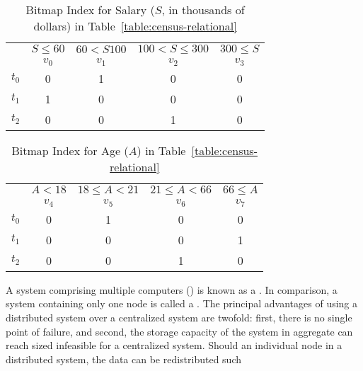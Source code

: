 \begin{table}[H]
    \centering
    \caption{Bitmap Index for Salary (\(S\), in thousands of dollars) in Table~\ref{table:census-relational}}
    \label{table:census-salary}
    \begin{tabular}{@{}r||c|c|c|c@{}}
        \toprule
                & \(S \leq 60\) & \(60 < S 100\) & \(100 < S \leq 300\) & \(300 \leq S\) \\
                & \(v_0\) & \(v_1\) & \(v_2\) & \(v_3\) \\
        \midrule
        \(t_0\) & 0          & 1             & 0          & 0             \\
        \(t_1\) & 1          & 0             & 0          & 0             \\
        \(t_2\) & 0          & 0             & 1          & 0             \\
        \bottomrule
    \end{tabular}
\end{table}
%
\begin{table}[H]
    \centering
    \caption{Bitmap Index for Age (\(A\)) in Table~\ref{table:census-relational}}
    \label{table:census-age}
    \begin{tabular}{@{}r||c|c|c|c@{}}
        \toprule
                & \(A < 18\) & \(18 \leq  A < 21\) & \(21 \leq A < 66\) & \(66 \leq A\) \\
                & \(v_4\) & \(v_5\) & \(v_6\) & \(v_7\) \\
        \midrule
        \(t_0\) & 0          & 1             & 0          & 0             \\
        \(t_1\) & 0          & 0             & 0          & 1             \\
        \(t_2\) & 0          & 0             & 1          & 0             \\
        \bottomrule
    \end{tabular}
\end{table}
\par
A system comprising multiple computers () is known as a
. In comparison, a system containing only one node is
called a . The principal advantages of using a
distributed system over a centralized system are twofold: first, there is no
single point of failure, and second, the storage capacity of the system in
aggregate can reach sized infeasible for a centralized system. Should an
individual node in a distributed system, the data can be redistributed such
